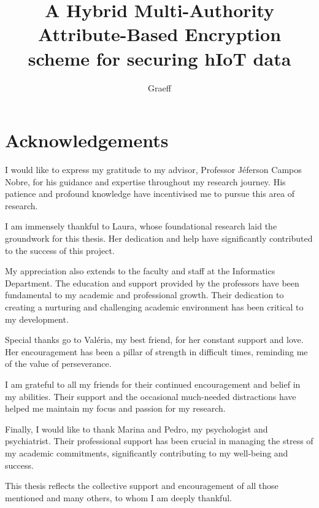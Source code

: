 \documentclass[cic,tc,english]{iiufrgs}
\title{
    A Hybrid Multi-Authority Attribute-Based Encryption scheme for securing hIoT data
}
\author{Graeff}{Felipe de Almeida}
\begin{document}
\maketitle



\chapter*{Acknowledgements}
    I would like to express my gratitude to my advisor, Professor Jéferson Campos Nobre, for his guidance and expertise throughout my research journey. His patience and profound knowledge have incentivised me to pursue this area of research.

    I am immensely thankful to Laura, whose foundational research laid the groundwork for this thesis. Her dedication and help have significantly contributed to the success of this project.

    My appreciation also extends to the faculty and staff at the Informatics Department. The education and support provided by the professors have been fundamental to my academic and professional growth. Their dedication to creating a nurturing and challenging academic environment has been critical to my development.

    Special thanks go to Valéria, my best friend, for her constant support and love. Her encouragement has been a pillar of strength in difficult times, reminding me of the value of perseverance.

    I am grateful to all my friends for their continued encouragement and belief in my abilities. Their support and the occasional much-needed distractions have helped me maintain my focus and passion for my research.

    Finally, I would like to thank Marina and Pedro, my psychologist and psychiatrist. Their professional support has been crucial in managing the stress of my academic commitments, significantly contributing to my well-being and success.

    This thesis reflects the collective support and encouragement of all those mentioned and many others, to whom I am deeply thankful.



\begin{abstract}
    \lipsum[1]
\end{abstract}

\begin{translatedabstract}
    \lipsum[1]
\end{translatedabstract}
\end{document}
